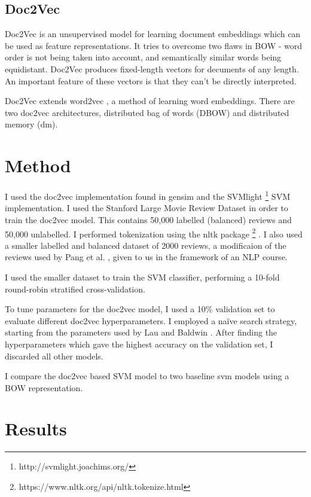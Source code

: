 \documentclass[a4paper]{article}
\begin{document}
\begin{multicols}{2}
\subsection{Doc2Vec}

Doc2Vec is an unsupervised model for learning document embeddings which can be used as feature representations. It tries to overcome two flaws in BOW - word order is not being taken into account, and semantically similar words being equidistant. Doc2Vec produces fixed-length vectors for decuments of any length. An important feature of these vectors is that they can't be directly interpreted.

Doc2Vec extends word2vec \cite{DBLP:journals/corr/MikolovSCCD13} , a method of learning word embeddings. There are two doc2vec architectures, distributed bag of words (DBOW) and distributed memory (dm).

\section{Method}

I used the doc2vec implementation found in gensim \cite{gensim} and the SVMlight \footnote{http://svmlight.joachims.org/} SVM implementation. I used the Stanford Large Movie Review Dataset \cite{maas-EtAl:2011:ACL-HLT2011} in order to train the doc2vec model. This contains 50,000 labelled (balanced) reviews and 50,000 unlabelled. I performed tokenization using the nltk package \footnote{https://www.nltk.org/api/nltk.tokenize.html} \cite{bird-loper-2004-nltk}. I also used a smaller labelled and balanced dataset of 2000 reviews, a modificaion of the reviews used by Pang et al. \cite{pang2002thumbs}, given to us in the framework of an NLP course.

I used the smaller dataset to train the SVM classifier, performing a 10-fold round-robin stratified cross-validation. 

To tune parameters for the doc2vec model, I used a 10\% validation set to evaluate different doc2vec hyperparameters. I employed a naïve search strategy, starting from the parameters used by Lau and Baldwin \cite{lau2016empirical}. After finding the hyperparameters which gave the highest accuracy on the validation set, I discarded all other models.

I compare the doc2vec based SVM model to two baseline svm models using a BOW representation.

\section{Results}


\end{multicols}
\end{document}
